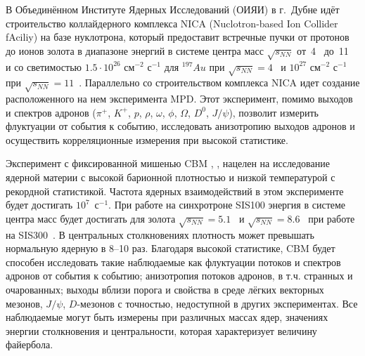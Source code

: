 \bigskip



В Объединённом Институте Ядерных Исследований (ОИЯИ) в г.~Дубне идёт строительство коллайдерного комплекса NICA (Nuclotron-based Ion Collider fAciliy) на базе нуклотрона, который предоставит встречные пучки от протонов до ионов золота в диапазоне энергий в системе центра масс $\sqrt{s_{NN}}$ от~4~\GeVperNucl{} до~11~\GeVperNucl{} и со светимостью $1.5 \cdot 10^{26}$ см$^{-2}$ с$^{-1}$ для $^{197}Au$ при $\sqrt{s_{NN}}=4$~\GeVperNucl{} и $10^{27}$ см$^{-2}$ с$^{-1}$ при $\sqrt{s_{NN}}=11$~\GeVperNucl{}. Параллельно со строительством комплекса NICA идет создание расположенного на нем эксперимента MPD. Этот эксперимент, помимо выходов и спектров адронов ($\pi^{+}$, $K^{+}$, $p$, $\rho$, $\omega$, $\phi$, $\Omega$, $D^{0}$, $J/\psi$), позволит измерить флуктуации от события к событию, исследовать анизотропию выходов адронов и осуществить корреляционные измерения при высокой статистике.

\bigskip



Эксперимент с фиксированной мишенью CBM \cite{CBMSIS100}, \cite{CBM_TSR}, \cite{ProgressReport2014} нацелен на исследование ядерной материи с высокой барионной плотностью и низкой температурой с рекордной статистикой. Частота ядерных взаимодействий в этом эксперименте будет достигать $10^7$~с$^{-1}$. При работе на синхротроне SIS100 энергия в системе центра масс будет достигать для золота $\sqrt{s_{NN}}=5.1$~\GeVperNucl{} и $\sqrt{s_{NN}}=8.6$~\GeVperNucl{} при работе на SIS300~\cite{CBMBook}. В центральных столкновениях плотность может превышать нормальную ядерную в 8--10 раз. Благодаря высокой статистике, CBM будет способен исследовать такие наблюдаемые как флуктуации потоков и спектров адронов от события к событию; анизотропия потоков адронов, в т.ч. странных и очарованных; выходы вблизи порога и свойства в среде лёгких векторных мезонов, $J/\psi$, $D$-мезонов с точностью, недоступной в других экспериментах. Все наблюдаемые могут быть измерены при различных массах ядер, значениях энергии столкновения и центральности, которая характеризует величину файербола.

